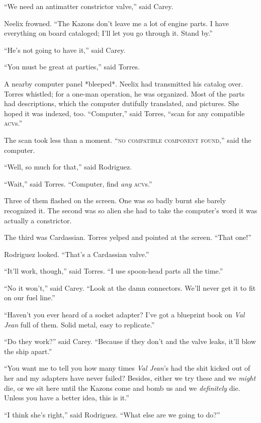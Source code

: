 \documentclass[twoside,letterpaper,12pt]{memoir}
\begin{document}
``We need an antimatter constrictor valve,'' said Carey.

Neelix frowned. ``The Kazons don't leave me a lot of engine parts. I have everything on board cataloged; I'll let you go through it. Stand by.''

``He's not going to have it,'' said Carey.

``You must be great at parties,'' said Torres.

A nearby computer panel *bleeped*. Neelix had transmitted his catalog over. Torres whistled; for a one-man operation, he was organized. Most of the parts had descriptions, which the computer dutifully translated, and pictures. She hoped it was indexed, too. ``Computer,'' said Torres, ``scan for any compatible \textsc{acv}s.''

The scan took less than a moment. ``\textsc{no compatible component found},'' said the computer.

``Well, so much for that,'' said Rodriguez.

``Wait,'' said Torres. ``Computer, find \textit{any} \textsc{acv}s.''

Three of them flashed on the screen. One was so badly burnt she barely recognized it. The second was so alien she had to take the computer's word it was actually a constrictor.

The third was Cardassian. Torres yelped and pointed at the screen. ``That one!''

Rodriguez looked. ``That's a Cardassian valve.''

``It'll work, though,'' said Torres. ``I use spoon-head parts all the time.''

``No it won't,'' said Carey. ``Look at the damn connectors. We'll never get it to fit on our fuel line.''

``Haven’t you ever heard of a socket adapter? I’ve got a blueprint book on \textit{Val Jean }full of them. Solid metal, easy to replicate.''

``Do they work?'' said Carey. ``Because if they don't and the valve leaks, it'll blow the ship apart.''

``You want me to tell you how many times \textit{Val Jean}'s had the shit kicked out of her and my adapters have never failed? Besides, either we try these and we \textit{might} die, or we sit here until the Kazons come and bomb us and we \textit{definitely} die. Unless you have a better idea, this is it.''

``I think she's right,'' said Rodriguez. ``What else are we going to do?''
\end{document}
